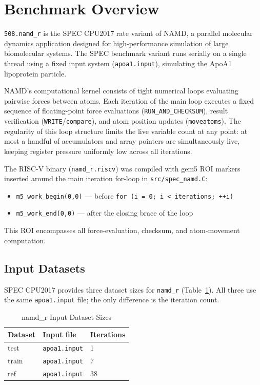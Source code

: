 \documentclass[conference]{IEEEtran}
\begin{document}
\section{Benchmark Overview}

\texttt{508.namd\_r} is the SPEC CPU2017 rate variant of NAMD, a
parallel molecular dynamics application designed for high-performance
simulation of large biomolecular systems. The SPEC benchmark variant
runs serially on a single thread using a fixed input system
(\texttt{apoa1.input}), simulating the ApoA1 lipoprotein particle.

NAMD's computational kernel consists of tight numerical loops
evaluating pairwise forces between atoms. Each iteration of the main
loop executes a fixed sequence of floating-point force evaluations
(\texttt{RUN\_AND\_CHECKSUM}), result verification
(\texttt{WRITE}/\texttt{compare}), and atom position updates
(\texttt{moveatoms}). The regularity of this loop structure limits
the live variable count at any point: at most a handful of accumulators
and array pointers are simultaneously live, keeping register pressure
uniformly low across all iterations.

The RISC-V binary (\texttt{namd\_r.riscv}) was compiled with gem5
ROI markers inserted around the main iteration for-loop in
\texttt{src/spec\_namd.C}:
\begin{itemize}
    \item \texttt{m5\_work\_begin(0,0)} --- before \texttt{for (i = 0; i < iterations; ++i)}
    \item \texttt{m5\_work\_end(0,0)}   --- after the closing brace of the loop
\end{itemize}
This ROI encompasses all force-evaluation, checksum, and atom-movement
computation.

\subsection{Input Datasets}

SPEC CPU2017 provides three dataset sizes for \texttt{namd\_r}
(Table~\ref{tab:inputs}). All three use the same \texttt{apoa1.input}
file; the only difference is the iteration count.

\begin{table}[H]
\centering
\caption{namd\_r Input Dataset Sizes}
\label{tab:inputs}
\begin{tabular}{lll}
\toprule
\textbf{Dataset} & \textbf{Input file} & \textbf{Iterations} \\
\midrule
test  & \texttt{apoa1.input} & 1 \\
train & \texttt{apoa1.input} & 7 \\
ref   & \texttt{apoa1.input} & 38 \\
\bottomrule
\end{tabular}
\end{table}
\end{document}
